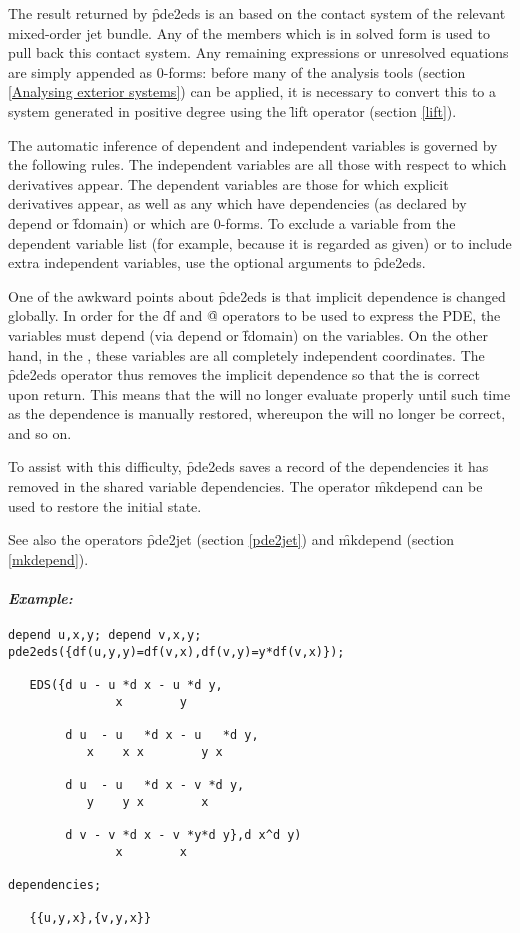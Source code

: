 The result returned by \f{pde2eds} is an  based on the contact
system of the relevant mixed-order jet bundle. Any of the 
members which is in solved form is used to pull back this contact
system. Any remaining expressions or unresolved equations are simply
appended as 0-forms: before many of the analysis tools (section
\ref{Analysing exterior systems}) can be applied, it is necessary to
convert this to a system generated in positive degree using the \f{lift}
operator (section \ref{lift}).

The automatic inference of dependent and independent variables is governed
by the following rules. The independent variables are all those with
respect to which derivatives appear. The dependent variables are those
for which explicit derivatives appear, as well as any which have
dependencies (as declared by \f{depend} or \f{fdomain}) or which are 0-forms.
To exclude a variable from the dependent variable list (for example,
because it is regarded as given) or to include extra independent variables,
use the optional arguments to \f{pde2eds}.

One of the awkward points about \f{pde2eds} is that implicit dependence
is changed globally. In order for the \f{df} and \f{@} operators to be used
to express the PDE, the  variables must depend (via
\f{depend} or \f{fdomain}) on the  variables. On the
other hand, in the , these variables are all completely
independent coordinates. The \f{pde2eds} operator thus removes the implicit
dependence so that the  is correct upon return. This means that
the  will no longer evaluate properly until such time as the
dependence is manually restored, whereupon the  will no longer be
correct, and so on.

To assist with this difficulty, \f{pde2eds} saves a record of the
dependencies it has removed in the shared variable \f{dependencies}. The
operator \f{mkdepend} can be used to restore the initial state.

See also the operators \f{pde2jet} (section \ref{pde2jet}) and \f{mkdepend}
(section \ref{mkdepend}).

\paragraph{\emph{Example:}}
\begin{verbatim}
depend u,x,y; depend v,x,y;
pde2eds({df(u,y,y)=df(v,x),df(v,y)=y*df(v,x)});

   EDS({d u - u *d x - u *d y,
               x        y

        d u  - u   *d x - u   *d y,
           x    x x        y x

        d u  - u   *d x - v *d y,
           y    y x        x

        d v - v *d x - v *y*d y},d x^d y)
               x        x

dependencies;

   {{u,y,x},{v,y,x}}
\end{verbatim}

